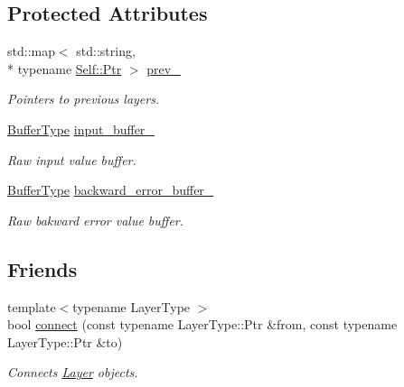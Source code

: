\subsection*{Protected Attributes}
\begin{DoxyCompactItemize}
\item 
std\-::map$<$ std\-::string, \\*
typename \hyperlink{classffnn_1_1layer_1_1_layer_a0efb2ac9125e1fa8f905bd4eed765201}{Self\-::\-Ptr} $>$ \hyperlink{classffnn_1_1layer_1_1_layer_ad665f209da80c13770f2b6a790d3ed4f}{prev\-\_\-}
\begin{DoxyCompactList}\small\item\em Pointers to previous layers. \end{DoxyCompactList}\item 
\hyperlink{classffnn_1_1layer_1_1_layer_a981f9bea21513a7b61222b1cda9294e7}{Buffer\-Type} \hyperlink{classffnn_1_1layer_1_1_layer_a8595d0898a1530aaec71aec487037655}{input\-\_\-buffer\-\_\-}
\begin{DoxyCompactList}\small\item\em Raw input value buffer. \end{DoxyCompactList}\item 
\hyperlink{classffnn_1_1layer_1_1_layer_a981f9bea21513a7b61222b1cda9294e7}{Buffer\-Type} \hyperlink{classffnn_1_1layer_1_1_layer_a1be25b9933d64c2964b4260db770ad48}{backward\-\_\-error\-\_\-buffer\-\_\-}
\begin{DoxyCompactList}\small\item\em Raw bakward error value buffer. \end{DoxyCompactList}\end{DoxyCompactItemize}
\subsection*{Friends}
\begin{DoxyCompactItemize}
\item 
{\footnotesize template$<$typename Layer\-Type $>$ }\\bool \hyperlink{classffnn_1_1layer_1_1_layer_afbf91ff52dc8c3e894968dcc27cdecd5}{connect} (const typename Layer\-Type\-::\-Ptr \&from, const typename Layer\-Type\-::\-Ptr \&to)
\begin{DoxyCompactList}\small\item\em Connects \hyperlink{classffnn_1_1layer_1_1_layer}{Layer} objects. \end{DoxyCompactList}\end{DoxyCompactItemize}


